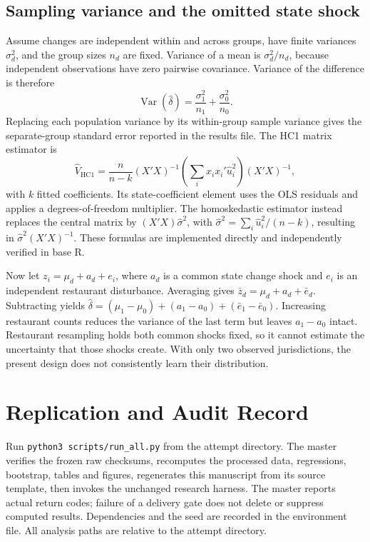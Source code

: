 \documentclass[11pt]{article}
\begin{document}
\subsection{Sampling variance and the omitted state shock}
Assume changes are independent within and across groups, have finite variances $\sigma_d^2$, and the group sizes $n_d$ are fixed. Variance of a mean is $\sigma_d^2/n_d$, because independent observations have zero pairwise covariance. Variance of the difference is therefore
\begin{equation}
\operatorname{Var}(\widehat\delta)=\frac{\sigma_1^2}{n_1}
 +\frac{\sigma_0^2}{n_0}.
\end{equation}
Replacing each population variance by its within-group sample variance gives the separate-group standard error reported in the results file. The HC1 matrix estimator is
\begin{equation}
\widehat V_{\mathrm{HC1}}
=\frac{n}{n-k}(X'X)^{-1}
 \left(\sum_i x_i x_i'\widehat u_i^2\right)(X'X)^{-1},
\end{equation}
with $k$ fitted coefficients. Its state-coefficient element uses the OLS residuals and applies a degrees-of-freedom multiplier. The homoskedastic estimator instead replaces the central matrix by $(X'X)\widehat\sigma^2$, with $\widehat\sigma^2=\sum_i\widehat u_i^2/(n-k)$, resulting in $\widehat\sigma^2(X'X)^{-1}$. These formulas are implemented directly and independently verified in base R. %

Now let $z_i=\mu_d+a_d+e_i$, where $a_d$ is a common state change shock and $e_i$ is an independent restaurant disturbance. Averaging gives $\bar z_d=\mu_d+a_d+\bar e_d$. Subtracting yields $\widehat\delta=(\mu_1-\mu_0)+(a_1-a_0)+(\bar e_1-\bar e_0)$. Increasing restaurant counts reduces the variance of the last term but leaves $a_1-a_0$ intact. Restaurant resampling holds both common shocks fixed, so it cannot estimate the uncertainty that those shocks create. With only two observed jurisdictions, the present design does not consistently learn their distribution. %

\section{Replication and Audit Record}
Run \texttt{python3 scripts/run\_all.py} from the attempt directory. The master verifies the frozen raw checksums, recomputes the processed data, regressions, bootstrap, tables and figures, regenerates this manuscript from its source template, then invokes the unchanged research harness. The master reports actual return codes; failure of a delivery gate does not delete or suppress computed results. Dependencies and the seed are recorded in the environment file. All analysis paths are relative to the attempt directory. %
\end{document}
